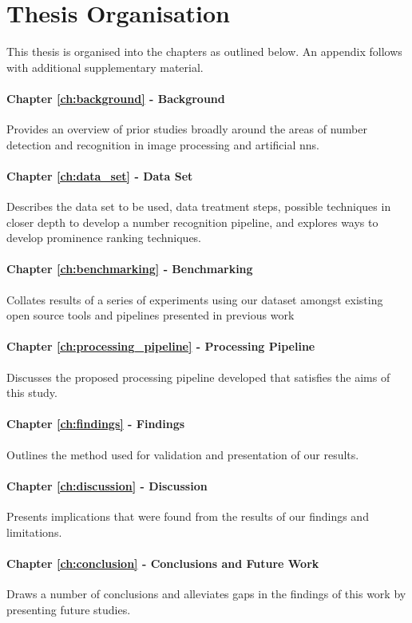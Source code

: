 \section{Thesis Organisation}

This thesis is organised into the chapters as outlined below. An appendix follows with additional supplementary material.

\paragraph{Chapter \ref{ch:background} - Background} Provides an overview of prior studies broadly around the areas of number detection and recognition in image processing and artificial \glspl{nn}.

\paragraph{Chapter \ref{ch:data_set} - Data Set} Describes the data set to be used, data treatment steps, possible techniques in closer depth to develop a number recognition pipeline, and explores ways to develop prominence ranking techniques.

\paragraph{Chapter \ref{ch:benchmarking} - Benchmarking} Collates results of a series of experiments using our dataset amongst existing open source tools and pipelines presented in previous work

\paragraph{Chapter \ref{ch:processing_pipeline} - Processing Pipeline} Discusses the proposed processing pipeline developed that satisfies the aims of this study.

\paragraph{Chapter \ref{ch:findings} - Findings} Outlines the method used for validation and presentation of our results.

\paragraph{Chapter \ref{ch:discussion} - Discussion} Presents implications that were found from the results of our findings and limitations.

\paragraph{Chapter \ref{ch:conclusion} - Conclusions and Future Work} Draws a number of conclusions and alleviates gaps in the findings of this work by presenting future studies.